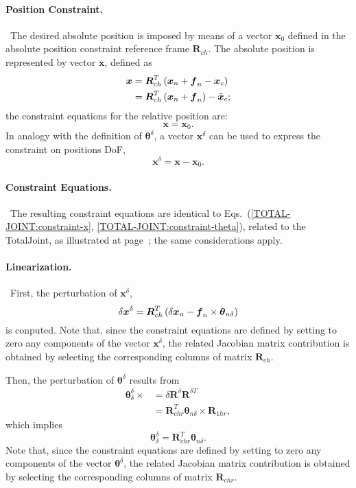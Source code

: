 \documentclass[10pt,dvips,fleqn,subeqn]{report}
\newcommand{\T}[1]{\boldsymbol{#1}}
\begin{document}
\paragraph{Position Constraint.} \
The desired absolute position is imposed by means of a vector $\T{x}_0$
defined in the absolute position constraint reference frame $\T{R}_{ch}$.
The absolute position is represented by vector $\T{x}$, defined as
\begin{align}
	\T{x} &= \T{R}_{ch}^T\plbr{
		\T{x}_n + \T{f}_n - \T{x}_c
	} \nonumber \\
	&= \T{R}_{ch}^T\plbr{
		\T{x}_n + \T{f}_n
	} - \tilde{\T{x}}_c ;
\end{align}
the constraint equations for the relative position are:
\begin{equation}
	\T{x} = \T{x}_0 .
\end{equation}
In analogy with the definition of $\T{\theta}^{\delta}$, a vector
$\T{x}^{\delta}$ can be used to express the constraint on positions DoF,
\begin{equation}
	\T{x}^{\delta} = \T{x} - \T{x}_0 .
\end{equation}

\paragraph{Constraint Equations.} \
The resulting constraint equations are identical
to Eqs.~(\ref{TOTAL-JOINT:constraint-x}, \ref{TOTAL-JOINT:constraint-theta}),
related to the TotalJoint, as illustrated
at page~\pageref{TOTAL-JOINT:constraint-x};
the same considerations apply.

\paragraph{Linearization.} \
First, the perturbation of $\T{x}^{\delta}$,
\begin{equation}
	\delta \T{x}^{\delta} = 
	\T{R}_{ch}^T\plbr{
		\delta\T{x}_n - \T{f}_n \times \T{\theta}_{n\delta}
	}
\end{equation}
is conputed.
Note that, since the constraint equations are defined by setting 
to zero any components of the vector $\T{x}^{\delta}$, the
related Jacobian matrix contribution is obtained by selecting 
the corresponding columns of matrix $\T{R}_{ch}$.

Then, the perturbation of $\T{\theta}^{\delta}$ results from
\begin{align}
	\T{\theta}^{\delta}_{\delta} \times{}
	&= \delta\T{R}^{\delta} \T{R}^{\delta T} \nonumber \\
	&= \T{R}_{chr}^T \T{\theta}_{n\delta} \times \T{R}_{1hr} ,
\end{align}
which implies
\begin{equation}
	\T{\theta}^{\delta}_{\delta} = \T{R}_{chr}^T \T{\theta}_{n\delta} .
\end{equation}
Note that, since the constraint equations are defined by setting 
to zero any components of the vector $\T{\theta}^{\delta}$, the
related Jacobian matrix contribution is obtained by selecting 
the corresponding columns of matrix $\T{R}_{chr}$.
\end{document}
